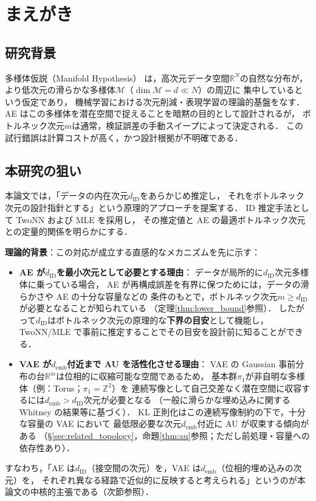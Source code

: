 \documentclass[12pt,a4paper]{jsarticle}
\newcommand{\dID}{d_{\mathrm{ID}}}
\newcommand{\dz}{m}                         %
\newcommand{\R}{\mathbb{R}}
\newcommand{\demb}{d_{\mathrm{emb}}}
\begin{document}
\section{まえがき}\label{sec:intro}

\subsection{研究背景}\label{sec:intro_bg}

多様体仮説（Manifold Hypothesis）\cite{fefferman2016manifold,bengio2013representation}
は，高次元データ空間$\R^N$の自然な分布が，
より低次元の滑らかな多様体$\mathcal{M}$（$\dim\mathcal{M} = d \ll N$）の周辺に
集中しているという仮定であり，
機械学習における次元削減・表現学習の理論的基盤をなす．
AE はこの多様体を潜在空間で捉えることを暗黙の目的として設計されるが，
ボトルネック次元$\dz$は通常，検証誤差の手動スイープによって決定される．
この試行錯誤は計算コストが高く，かつ設計根拠が不明確である．

\subsection{本研究の狙い}\label{sec:intro_aim}

本論文では，「データの内在次元$\dID$をあらかじめ推定し，
それをボトルネック次元の設計指針とする」という原理的アプローチを提案する．
ID 推定手法として TwoNN\cite{facco2017twonn} および MLE\cite{levina2005mle} を採用し，
その推定値と AE の最適ボトルネック次元との定量的関係を明らかにする．

\textbf{理論的背景}：この対応が成立する直感的なメカニズムを先に示す：
\begin{itemize}
  \item \textbf{AE が$\dID$を最小次元として必要とする理由}：
    データが局所的に$\dID$次元多様体に乗っている場合，
    AE が再構成誤差を有界に保つためには，データの滑らかさや AE の十分な容量などの
    条件のもとで，ボトルネック次元$m \geq \dID$が必要となることが知られている
    （定理\ref{thm:lower_bound}参照）．
    したがって$\dID$はボトルネック次元の原理的な\textbf{下界の目安}として機能し，
    TwoNN/MLE で事前に推定することでその目安を設計前に知ることができる．
  \item \textbf{VAE が$\demb$付近まで AU を活性化させる理由}：
    VAE の Gaussian 事前分布の台$\R^m$は位相的に収縮可能な空間であるため，
    基本群$\pi_1$が非自明な多様体（例：Torus；$\pi_1 = \mathbb{Z}^2$）を
    連続写像として自己交差なく潜在空間に収容するには$\demb > \dID$次元が必要となる
    （一般に滑らかな埋め込みに関する Whitney の結果等に基づく）．
    KL 正則化はこの連続写像制約の下で，十分な容量の VAE において
    最低限必要な次元$\demb$付近に AU が収束する傾向がある
    （§\ref{sec:related_topology}，命題\ref{thm:au}参照；ただし前処理・容量への依存性あり）．
\end{itemize}
すなわち，「AE は$\dID$（接空間の次元）を，VAE は$\demb$（位相的埋め込みの次元）を，
それぞれ異なる経路で近似的に反映すると考えられる」というのが本論文の中核的主張である（次節参照）．
\end{document}
